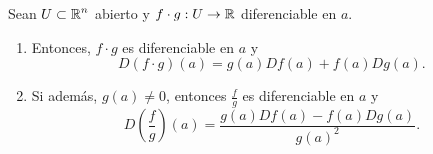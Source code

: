 \begin{colorary}
Sean $\displaystyle U \subset \mathbb{R}^{n} $ abierto y $\displaystyle f \cdot g : U \to \mathbb{R} $ diferenciable en $\displaystyle a $. 
\begin{enumerate}
\item Entonces, $\displaystyle f \cdot g $ es diferenciable en $\displaystyle a $ y 
\[D\left(f \cdot g\right)\left(a\right) = g\left(a\right)Df\left(a\right) + f\left(a\right)Dg\left(a\right) .\]
\item Si además, $\displaystyle g\left(a\right) \neq 0 $, entonces $\displaystyle \frac{f}{g} $ es diferenciable en $\displaystyle a $ y
	\[D\left(\frac{f}{g}\right)\left(a\right) = \frac{g\left(a\right)Df\left(a\right)-f\left(a\right)Dg\left(a\right)}{g\left(a\right)^{2}} .\]
\end{enumerate}
\end{colorary}
